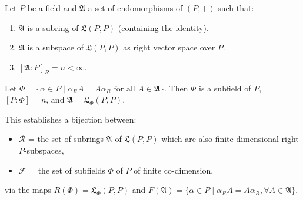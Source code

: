 Let $P$ be a field and $\mathfrak{A}$ a set of endomorphisms of $(P, +)$ such that:
\begin{enumerate}
\item[(i)] $\mathfrak{A}$ is a subring of $\mathfrak{L}(P, P)$ (containing the identity).
\item[(ii)] $\mathfrak{A}$ is a subspace of $\mathfrak{L}(P, P)$ as right vector space over $P$.
\item[(iii)] $[\mathfrak{A}:P]_R = n < \infty$.
\end{enumerate}
Let $\Phi = \{\alpha \in P \mid \alpha_R A = A \alpha_R \text{ for all } A \in \mathfrak{A}\}$. Then $\Phi$ is a subfield of $P$, $[P:\Phi] = n$, and $\mathfrak{A} = \mathfrak{L}_\Phi(P, P)$.

This establishes a bijection between:
\begin{itemize}
\item $\mathcal{R}$ = the set of subrings $\mathfrak{A}$ of $\mathfrak{L}(P,P)$ which are also finite-dimensional right $P$-subspaces,
\item $\mathcal{F}$ = the set of subfields $\Phi$ of $P$ of finite co-dimension,
\end{itemize}
via the maps $R(\Phi) = \mathfrak{L}_\Phi(P, P)$ and $F(\mathfrak{A}) = \{\alpha \in P \mid \alpha_R A = A \alpha_R, \forall A \in \mathfrak{A}\}$.
